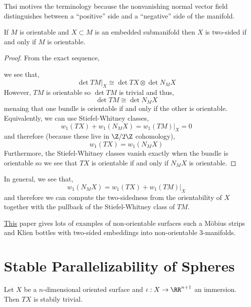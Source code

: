 \documentclass[12pt]{article}
\begin{document}
\begin{rmk}
Thsi motives the terminology because the nonvanishing normal vector field distinguishes between a ``positive'' side and a ``negative'' side of the manifold.
\end{rmk}

\begin{prop}
If $M$ is orientable and $X \subset M$ is an embedded submanifold then $X$ is two-sided if and only if $M$ is orientable.
\end{prop}

\begin{proof}
From the exact sequence,
\begin{center}
\end{center}
we see that,
\[ \det{TM|_X} \cong \det{TX} \otimes \det{N_M X} \]
However, $TM$ is orientable so $\det{TM}$ is trivial and thus,
\[ \det{TM} \cong \det{N_M X} \]
menaing that one bundle is orientable if and only if the other is orientable. Equivalently, we can use Stiefel-Whitney classes,
\[ w_1(TX) + w_1(N_M X) = w_1(TM)|_X = 0 \]
and therefore (because these live in $\Z/2\Z$ cohomology),
\[ w_1(TX) = w_1(N_M X) \]
Furthermore, the Stiefel-Whitney classes vanish exactly when the bundle is orientable so we see that $TX$ is orientable if and only if $N_M X$ is orientable.
\end{proof}

\begin{rmk}
In general, we see that,
\[ w_1(N_M X) = w_1(TX) + w_1(TM)|_X \]
and therefore we can compute the two-sidedness from the orientability of $X$ together with the pullback of the Stiefel-Whitney class of $TM$.
\end{rmk}


\begin{rmk}
\href{https://www.jstor.org/stable/pdf/3026946.pdf}{This} paper gives lots of examples of non-orientable surfaces such a M\"{o}bius strips and Klien bottles with two-sided embeddings into non-orientable $3$-manifolds.
\end{rmk}

\section{Stable Parallelizability of Spheres}

\begin{prop}
Let $X$ be a $n$-dimensional oriented surface and $\iota : X \to \RR^{n+1}$ an immersion. Then $TX$ is stabily trivial.
\end{prop}
\end{document}
